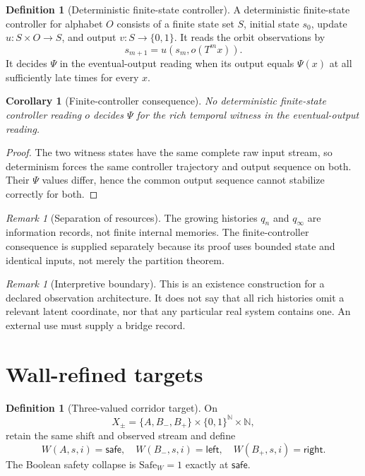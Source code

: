 \documentclass[11pt]{article}
\newcommand{\Bbits}{\ensuremath{\{0,1\}}}
\theoremstyle{plain}
\newtheorem{corollary}[theorem]{Corollary}
\theoremstyle{definition}
\newtheorem{definition}[theorem]{Definition}
\theoremstyle{remark}
\newtheorem{remark}[theorem]{Remark}
\begin{document}
\begin{definition}[Deterministic finite-state controller]
A deterministic finite-state controller for alphabet $O$ consists of a finite
state set $S$, initial state $s_0$, update $u:S\times O\to S$, and output
$v:S\to\Bbits$.  It reads the orbit observations by
\[
s_{m+1}=u(s_m,o(T^m x)).
\]
It decides $\Psi$ in the eventual-output reading when its output equals
$\Psi(x)$ at all sufficiently late times for every $x$.
\end{definition}

\begin{corollary}[Finite-controller consequence]
No deterministic finite-state controller reading $o$ decides $\Psi$ for the
rich temporal witness in the eventual-output reading.
\end{corollary}

\begin{proof}
The two witness states have the same complete raw input stream, so determinism
forces the same controller trajectory and output sequence on both.  Their
$\Psi$ values differ, hence the common output sequence cannot stabilize correctly
for both.
\end{proof}

\begin{remark}[Separation of resources]
The growing histories $q_n$ and $q_\infty$ are information records, not finite
internal memories.  The finite-controller consequence is supplied separately
because its proof uses bounded state and identical inputs, not merely the
partition theorem.
\end{remark}

\begin{remark}[Interpretive boundary]
This is an existence construction for a declared observation architecture.  It
does not say that all rich histories omit a relevant latent coordinate, nor that
any particular real system contains one.  An external use must supply a bridge
record.
\end{remark}

\section{Wall-refined targets}
\label{sec:wall}

\begin{definition}[Three-valued corridor target]
On
\[
X_\pm=\{A,B_-,B_+\}\times\Bbits^{\mathbb N}\times\mathbb N,
\]
retain the same shift and observed stream and define
\[
W(A,s,i)=\mathsf{safe},\quad
W(B_-,s,i)=\mathsf{left},\quad
W(B_+,s,i)=\mathsf{right}.
\]
The Boolean safety collapse is $\mathrm{Safe}_W=1$ exactly at $\mathsf{safe}$.
\end{definition}
\end{document}
